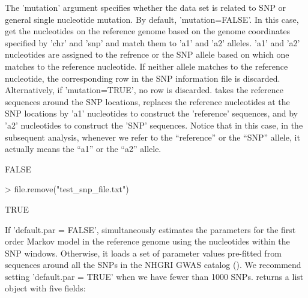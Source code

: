 \documentclass[a4paper,10pt]{article}
\begin{document}
The 'mutation' argument specifies whether the data set is related to SNP or general single nucleotide mutation. By default, 'mutation=FALSE'. In this case,  get the nucleotides on the reference genome based on the genome coordinates specified by 'chr' and 'snp' and match them to 'a1' and 'a2' alleles. 'a1' and 'a2' nucleotides are assigned to the refrence or the SNP allele based on which one matches to the reference nucleotide. If neither allele matches to the reference nucleotide, the corresponding row in the SNP information file is discarded. Alternatively, if 'mutation=TRUE', no row is discarded.  takes the reference sequences around the SNP locations, replaces the reference nucleotides at the SNP locations by 'a1' nucleotides to construct the 'reference' sequences, and by 'a2' nucleotides to construct the 'SNP' sequences. Notice that in this case, in the subsequent analysis, whenever we refer to the ``reference'' or the ``SNP'' allele, it actually means the ``a1'' or the ``a2'' allele.

\begin{Schunk}
\begin{Soutput}
[1] FALSE
\end{Soutput}
\begin{Sinput}
> file.remove("test_snp_file.txt")
\end{Sinput}
\begin{Soutput}
[1] TRUE
\end{Soutput}
\end{Schunk}


If 'default.par = FALSE',  simultaneously estimates the parameters for the first order Markov model in the reference genome using the nucleotides within the SNP windows. Otherwise, it loads a set of parameter values pre-fitted from sequences around all the SNPs in the NHGRI GWAS catalog (\cite{nhgri-gwas}). We recommend setting 'default.par = TRUE' when we have fewer than 1000 SNPs.  returns a list object with five fields:
\end{document}
